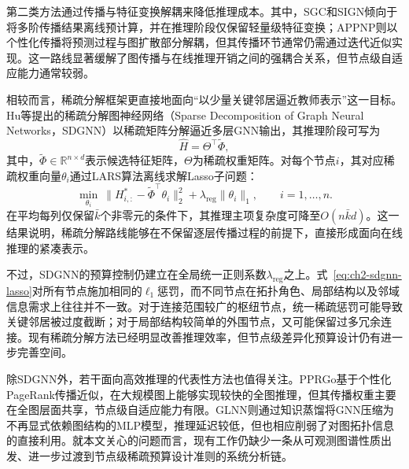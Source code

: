 第二类方法通过传播与特征变换解耦来降低推理成本。其中，SGC\cite{Wu2019SGC}和SIGN\cite{Frasca2020SIGN}倾向于将多阶传播结果离线预计算，并在推理阶段仅保留轻量级特征变换；APPNP\cite{Gasteiger2019APPNP}则以个性化传播将预测过程与图扩散部分解耦，但其传播环节通常仍需通过迭代近似实现。这一路线显著缓解了图传播与在线推理开销之间的强耦合关系，但节点级自适应能力通常较弱。

相较而言，稀疏分解框架更直接地面向“以少量关键邻居逼近教师表示”这一目标。Hu等提出的稀疏分解图神经网络（Sparse Decomposition of Graph Neural Networks，SDGNN）\cite{Hu2024SDGNN}以稀疏矩阵分解逼近多层GNN输出，其推理阶段可写为
\begin{equation}
  \hat{H} = \Theta^\top \tilde{\Phi},
  \label{eq:ch2-sdgnn-infer}
\end{equation}
其中，$\tilde{\Phi}\in\mathbb{R}^{n\times d}$表示候选特征矩阵，$\Theta$为稀疏权重矩阵。对每个节点$i$，其对应稀疏权重向量$\theta_i$通过LARS算法离线求解Lasso子问题：
\begin{equation}
  \min_{\theta_i}\ \|H^*_{i,:}-\tilde{\Phi}^{\top}\theta_i\|_2^2+\lambda_{\mathrm{reg}}\|\theta_i\|_1,\qquad i=1,\ldots,n.
  \label{eq:ch2-sdgnn-lasso}
\end{equation}
在平均每列仅保留$\bar{k}$个非零元的条件下，其推理主项复杂度可降至$O(n\bar{k}d)$。这一结果说明，稀疏分解路线能够在不保留逐层传播过程的前提下，直接形成面向在线推理的紧凑表示。

不过，SDGNN的预算控制仍建立在全局统一正则系数$\lambda_{\mathrm{reg}}$之上。式~\eqref{eq:ch2-sdgnn-lasso}对所有节点施加相同的$\ell_1$惩罚，而不同节点在拓扑角色、局部结构以及邻域信息需求上往往并不一致。对于连接范围较广的枢纽节点，统一稀疏惩罚可能导致关键邻居被过度截断；对于局部结构较简单的外围节点，又可能保留过多冗余连接。现有稀疏分解方法已经明显改善推理效率，但节点级差异化预算设计仍有进一步完善空间。

除SDGNN外，若干面向高效推理的代表性方法也值得关注。PPRGo\cite{Bojchevski2020PPRGo}基于个性化PageRank传播近似，在大规模图上能够实现较快的全图推理，但其传播权重主要在全图层面共享，节点级自适应能力有限。GLNN\cite{Zhang2022GLNN}则通过知识蒸馏将GNN压缩为不再显式依赖图结构的MLP模型，推理延迟较低，但也相应削弱了对图拓扑信息的直接利用。就本文关心的问题而言，现有工作仍缺少一条从可观测图谱性质出发、进一步过渡到节点级稀疏预算设计准则的系统分析链。

